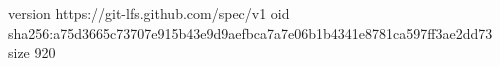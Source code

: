 version https://git-lfs.github.com/spec/v1
oid sha256:a75d3665c73707e915b43e9d9aefbca7a7e06b1b4341e8781ca597ff3ae2dd73
size 920
